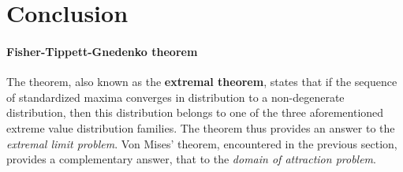 \section{Conclusion}
\paragraph{Fisher-Tippett-Gnedenko theorem} The  theorem, also known as the \textbf{extremal theorem}, states that if the sequence of standardized maxima converges in distribution to a non-degenerate distribution, then this distribution belongs to one of the three aforementioned extreme value distribution families. The theorem thus provides an answer to the \textit{extremal limit problem}. Von Mises' theorem, encountered in the previous section, provides a complementary answer, that to the \textit{domain of attraction problem}.






